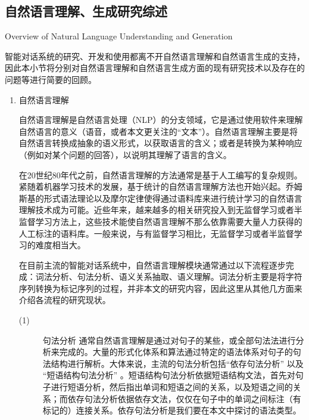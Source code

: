 \subsection{自然语言理解、生成研究综述}{Overview of Natural Language Understanding and Generation}

智能对话系统的研究、开发和使用都离不开自然语言理解和自然语言生成的支持，因此本小节将分别对自然语言理解和自然语言生成方面的现有研究技术以及存在的问题等进行简要的回顾。

\begin{enumerate}

\item{自然语言理解}

自然语言理解是自然语言处理（NLP）的分支领域，它是通过使用软件来理解自然语言的意义（语音，或者本文更关注的“文本”）。自然语言理解主要是将自然语言转换成抽象的语义形式，以获取语言的含义；或者是转换为某种响应（例如对某个问题的回答），以说明其理解了语言的含义。

在20世纪80年代之前，自然语言理解的方法通常是基于人工编写的复杂规则。紧随着机器学习技术的发展，基于统计的自然语言理解方法也开始兴起\cite{Tan1992}。乔姆斯基的形式语法理论以及摩尔定律使得通过语料库来进行统计学习的自然语言理解技术成为可能\cite{Gupta2014}。近些年来，越来越多的相关研究投入到无监督学习或者半监督学习方法上，这些技术能使自然语言理解不那么依靠需要大量人力获得的人工标注的语料库。一般来说，与有监督学习相比，无监督学习或者半监督学习的难度相当大\cite{Gupta2014}。

在目前主流的智能对话系统中，自然语言理解模块通常通过以下流程逐步完成：词法分析、句法分析、语义关系抽取、语义理解。词法分析主要是将字符序列转换为标记序列的过程，并非本文的研究内容，因此这里从其他几方面来介绍各流程的研究现状。


\begin{description}
\item[(1)]{句法分析}
通常自然语言理解是通过对句子的某些，或全部句法法进行分析来完成的。大量的形式化体系和算法通过特定的语法体系对句子的句法结构进行解析。大体来说，主流的句法分析包括“依存句法分析” \cite{Eisner1996a, Eisner1996b, Yamada2003} 以及 “短语结构句法分析” \cite{Chomsky1957, Pollard1994}。短语结构句法分析依据短语结构文法\cite{Thompson1981, Charniak1997, Makino1998, Charniak2006}，首先对句子进行短语分析，然后指出单词和短语之间的关系，以及短语之间的关系；而依存句法分析依据依存文法\cite{Tesniere1959, Melchunk1988}，仅仅在句子中的单词之间标注（有标记的）连接关系。依存句法分析是我们要在本文中探讨的语法类型。



\end{description}
\end{enumerate}
